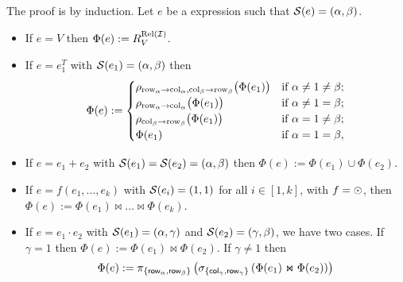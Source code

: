 The proof is by induction. Let $e$ be a \langsum expression such that $\mathcal{S} (e)=(\alpha, \beta)$.
\begin{itemize}
  \item If $e=V$ then $\Phi (e):=R_V^{\text{Rel}(\mathcal{I})}$.

  \item If $e=e_1^T$ with $\mathcal{S} (e_1)=(\alpha, \beta)$ then \[
\Phi(e) :=
\begin{cases}
\rho_{\mathrm{row}_\alpha \to \mathrm{col}_\alpha,\mathrm{col}_\beta \to \mathrm{row}_\beta}\bigl(\Phi(e_1)\bigr) & \text{if } \alpha \neq 1 \neq \beta; \cr
\rho_{\mathrm{row}_\alpha \to \mathrm{col}_\alpha}\bigl(\Phi(e_1)\bigr) & \text{if } \alpha \neq 1 = \beta; \cr
\rho_{\mathrm{col}_\beta \to \mathrm{row}_\beta}\bigl(\Phi(e_1)\bigr) & \text{if } \alpha = 1 \neq \beta; \cr
\Phi(e_1) & \text{if } \alpha = 1 = \beta,
\end{cases}
\]

  \item If $e=e_1+e_2$ with $\mathcal{S} (e_1)=\mathcal{S} (e_2)=(\alpha, \beta)$ then $\Phi (e):=\Phi (e_1)\cup \Phi (e_2)$.

  \item If $e=f(e_1,\ldots, e_k)$ with $\mathcal{S}(e_i)=(1,1)$ for all $i\in[1,k]$, with $f=\odot$, then $\Phi(e):=\Phi(e_1)\Join \ldots \Join\Phi(e_k)$.

  \item If $e=e_1\cdot e_2$ with $\mathcal{S} (e_1)=(\alpha, \gamma)$ and $\mathcal{S} (e_2)=(\gamma, \beta)$, we have two cases. If $\gamma = 1$ then $\Phi (e):=\Phi (e_1)\Join \Phi (e_2)$.
If $\gamma\neq 1$ then
$$
\Phi (e) := \pi_{\lbrace \mathsf{row}_{\alpha},\mathsf{row}_{\beta} \rbrace}\left( \sigma_{\lbrace \mathsf{col}_\gamma, \mathsf{row}_\gamma \rbrace} \left( \Phi (e_1)\Join \Phi (e_2) \right) \right)
$$


\end{itemize}
